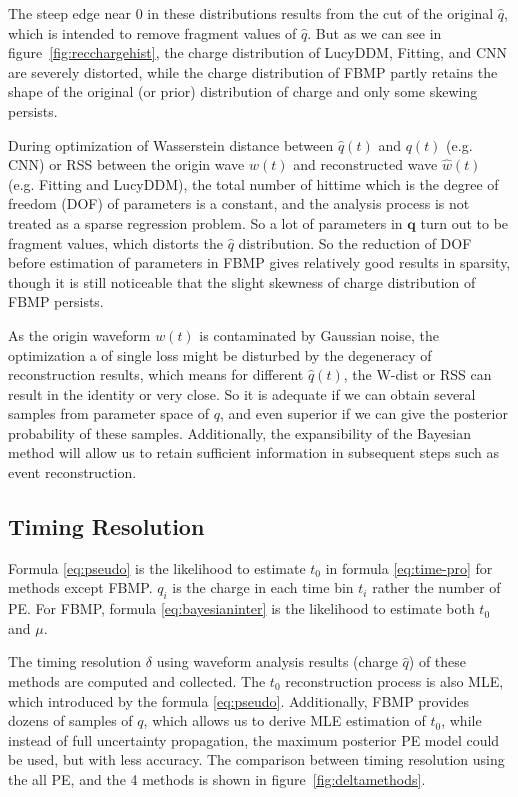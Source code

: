 The steep edge near 0 in these distributions results from the cut of the original $\hat{q}$, which is intended to remove fragment values of $\hat{q}$. But as we can see in figure~\ref{fig:recchargehist}, the charge distribution of LucyDDM, Fitting, and CNN are severely distorted, while the charge distribution of FBMP partly retains the shape of the original (or prior) distribution of charge and only some skewing persists. 

During optimization of Wasserstein distance between $\hat{q}(t)$ and $q(t)$ (e.g. CNN) or RSS between the origin wave $w(t)$ and reconstructed wave $\hat{w}(t)$ (e.g. Fitting and LucyDDM), the total number of hittime which is the degree of freedom (DOF) of parameters is a constant, and the analysis process is not treated as a sparse regression problem. So a lot of parameters in $\bm{q}$ turn out to be fragment values, which distorts the $\hat{q}$ distribution. So the reduction of DOF before estimation of parameters in FBMP gives relatively good results in sparsity, though it is still noticeable that the slight skewness of charge distribution of FBMP persists. 


As the origin waveform $w(t)$ is contaminated by Gaussian noise, the optimization a of single loss might be disturbed by the degeneracy of reconstruction results, which means for different $\hat{q}(t)$, the W-dist or RSS can result in the identity or very close. So it is adequate if we can obtain several samples from parameter space of $q$, and even superior if we can give the posterior probability of these samples. Additionally, the expansibility of the Bayesian method will allow us to retain sufficient information in subsequent steps such as event reconstruction. 

\subsection{Timing Resolution}
\label{subsec:timeresolution}


Formula \eqref{eq:pseudo} is the likelihood to estimate $t_{0}$ in formula \eqref{eq:time-pro} for methods except FBMP. $q_{i}$ is the charge in each time bin $t_{i}$ rather the number of PE. For FBMP, formula \eqref{eq:bayesianinter} is the likelihood to estimate both $t_{0}$ and $\mu$. 

The timing resolution $\delta$ using waveform analysis results (charge $\hat{q}$) of these methods are computed and collected. The $t_{0}$ reconstruction process is also MLE, which introduced by the formula \eqref{eq:pseudo}. Additionally, FBMP provides dozens of samples of $q$, which allows us to derive MLE estimation of $t_{0}$, while instead of full uncertainty propagation, the maximum posterior PE model could be used, but with less accuracy. The comparison between timing resolution using the all PE, and the 4 methods is shown in figure~\ref{fig:deltamethods}. 


